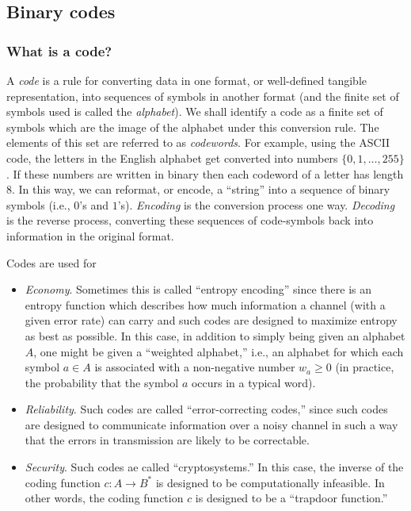 \subsection{Binary codes}


\subsubsection{What is a code?}

A {\it code} is a rule for converting data in one
format, or well-defined tangible representation,
into sequences of symbols in another format (and the finite set of symbols
used is called the {\it alphabet}). We shall identify a code
as a finite set of symbols which are the image
of the alphabet under this conversion rule. The elements of this set
are referred to as {\it codewords}. For example, using the ASCII code,
the letters in the English alphabet get converted into numbers
$\{0, 1, \dots, 255\}$. If these numbers are written in binary
then each codeword of a letter has length 8. In this way, we can
reformat, or encode, a ``string'' into a sequence of binary symbols (i.e.,
$0$'s and $1$'s).
{\it Encoding} is the conversion process one way.
{\it Decoding} is the reverse
process, converting these sequences of code-symbols back into information
in the original format.


Codes are used for

\begin{itemize}
\item
{\it Economy}. Sometimes this is called ``entropy encoding''
since there is an entropy function which describes how much information
a channel (with a given error rate) can carry and such
codes are designed to maximize entropy as best as possible.
In this case, in addition to simply being given an alphabet $A$, one
might be given a ``weighted alphabet,'' i.e., an alphabet for which each
symbol $a\in A$ is associated with a non-negative number
$w_a\geq 0$ (in practice, the probability that the
symbol $a$ occurs in a typical word).

\item
{\it Reliability}. Such codes are called ``error-correcting codes,''
since such codes are designed to communicate information
over a noisy channel in such a way that the errors in transmission are
likely to be correctable.

\item
{\it Security}. Such codes ae called ``cryptosystems.''
In this case, the inverse of the coding function $c:A\to B^*$ is designed to be
computationally infeasible. In other words, the coding function
$c$ is designed to be a ``trapdoor function.''

\end{itemize}


